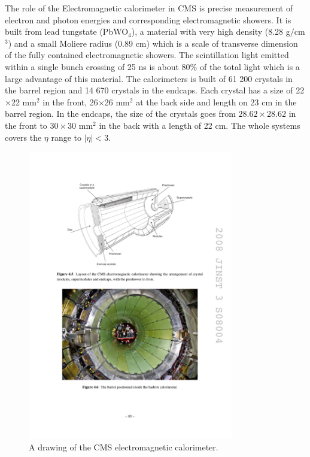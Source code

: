 The role of the Electromagnetic calorimeter in CMS is precise measurement of electron and photon energies and corresponding electromagnetic showers. It is built from lead tungstate (PbWO$_4$), a material with very high density (8.28 g$/$cm$^3$) and a small Moliere radius (0.89 cm) which is a scale of transverse dimension of the fully contained electromagnetic showers. The scintillation light emitted within a single bunch crossing of 25 ns is about 80$\%$ of the total light which is a large advantage of this material. The calorimeters is built of 61 200 crystals in the barrel region and 14 670 crystals in the endcaps. Each crystal has a size of 22$\times $22 mm$^2$ in the front, 26$\times$26 mm$^2$ at the back side and length on 23 cm in the barrel region. In the endcaps, the size of the crystals goes from $28.62\times 28.62$ in the front to $30\times 30$ mm$^2$ in the back with a length of 22 cm. The whole systems covers the $\eta$ range to $|\eta|<3$.
\begin{figure}[htbp]
	\centering
		\includegraphics[width=0.8\textwidth]{Figures/ECAL.pdf}
	\caption[CMS Electromagnetic Calorimeter]{A drawing of the CMS electromagnetic calorimeter. \cite{Chatrchyan:2008aa}}
	\label{fig:ECAL}
\end{figure}
